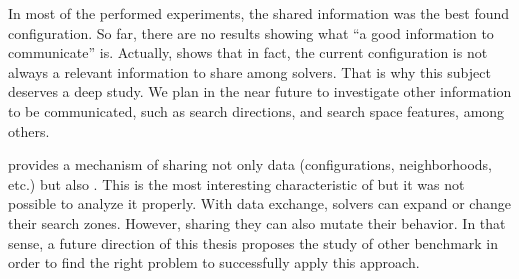

In most of the performed experiments, the shared information was the best found configuration. So far, there are no results showing what ``a good information to communicate'' is. Actually, \cite{Caniou14} shows that in fact, the current configuration is not always a relevant information to share among solvers. That is why this subject deserves a deep study. We plan in the near future to investigate other information to be communicated, such as search directions, and search space features, among others.

\posl{} provides a mechanism of sharing not only data (\ie configurations, neighborhoods, etc.) but also \oms{}. This is the most interesting characteristic of \posl{} but it was not possible to analyze it properly. With data exchange, solvers can expand or change their search zones. However, sharing \ms{} they can also mutate their behavior. In that sense, a future direction of this thesis proposes the study of other benchmark in order to find the right problem to successfully apply this approach.